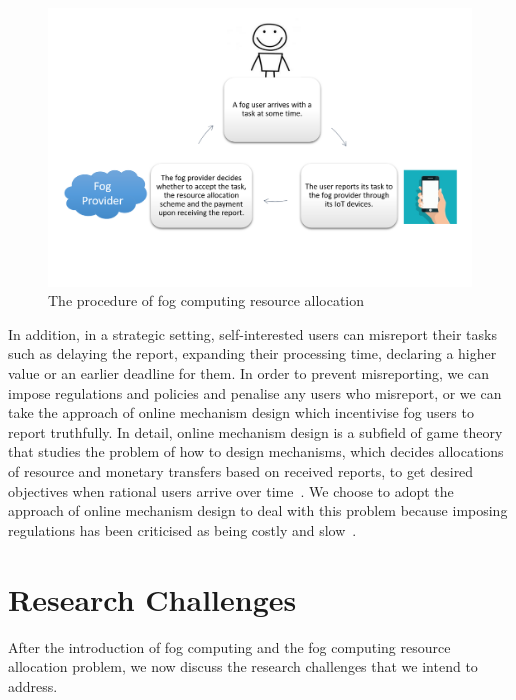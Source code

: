 \documentclass[11pt]{phdthesis}
\begin{document}
\begin{figure} 
	\centering
	\includegraphics[width=1\textwidth]{./Figures/Allocation_procedure.png}
	\caption{The procedure of fog computing resource allocation\protect\footnotemark}
	\label{fig: flow of resource allocation}
\end{figure}


In addition, in a strategic setting, self-interested users can misreport their tasks such as delaying the report, expanding their processing time, declaring a higher value or an earlier deadline for them. In order to prevent misreporting, we can impose regulations and policies and penalise any users who misreport, or we can take the approach of online mechanism design which incentivise fog users to report truthfully. In detail, online mechanism design is a subfield of game theory that studies the problem of how to design mechanisms, which decides allocations of resource and monetary transfers based on received reports, to get desired objectives when rational users arrive over time~\citep{nisan2007algorithmic}. We choose to adopt the approach of online mechanism design to deal with this problem because imposing regulations has been criticised as being costly and slow~\citep{demougin2001monitoring}.

\section{Research Challenges} \label{challenges}

After the introduction of fog computing and the fog computing resource allocation problem, we now discuss the research challenges that we intend to address. 
\end{document}
